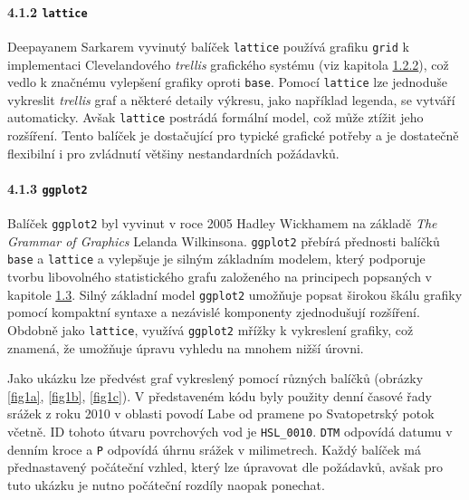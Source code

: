 \documentclass[12pt,]{article}
\let\oldparagraph\paragraph
\renewcommand{\paragraph}[1]{\oldparagraph{#1}\mbox{}}
\begin{document}
\paragraph{\texorpdfstring{4.1.2
\texttt{lattice}}{4.1.2 lattice}}\label{lattice}

\qquad Deepayanem Sarkarem vyvinutý balíček \texttt{lattice} používá
grafiku \texttt{grid} k implementaci Clevelandového \emph{trellis}
grafického systému (viz kapitola \protect\hyperlink{cleveland}{1.2.2}),
což vedlo k značnému vylepšení grafiky oproti \texttt{base}. Pomocí
\texttt{lattice} lze jednoduše vykreslit \emph{trellis} graf a některé
detaily výkresu, jako například legenda, se vytváří automaticky. Avšak
\texttt{lattice} postrádá formální model, což může ztížit jeho
rozšíření. Tento balíček je dostačující pro typické grafické potřeby a
je dostatečně flexibilní i pro zvládnutí většiny nestandardních
požádavků.

\newpage

\hypertarget{ggplot}{\paragraph{\texorpdfstring{4.1.3
\texttt{ggplot2}}{4.1.3 ggplot2}}\label{ggplot}}

\qquad Balíček \texttt{ggplot2} byl vyvinut v roce 2005 Hadley Wickhamem
na základě \emph{The Grammar of Graphics} Lelanda Wilkinsona.
\texttt{ggplot2} přebírá přednosti balíčků \texttt{base} a
\texttt{lattice} a vylepšuje je silným základním modelem, který
podporuje tvorbu libovolného statistického grafu založeného na
principech popsaných v kapitole \protect\hyperlink{gg}{1.3}. Silný
základní model \texttt{ggplot2} umožňuje popsat širokou škálu grafiky
pomocí kompaktní syntaxe a nezávislé komponenty zjednodušují rozšíření.
Obdobně jako \texttt{lattice}, využívá \texttt{ggplot2} mřížky k
vykreslení grafiky, což znamená, že umožňuje úpravu vyhledu na mnohem
nižší úrovni.

\qquad Jako ukázku lze předvést graf vykreslený pomocí různých balíčků
(obrázky \ref{fig1a}, \ref{fig1b}, \ref{fig1c}). V představeném kódu
byly použity denní časové řady srážek z roku 2010 v oblasti povodí Labe
od pramene po Svatopetrský potok včetně. ID tohoto útvaru povrchových
vod je \texttt{HSL\_0010}. \texttt{DTM} odpovídá datumu v denním kroce a
\texttt{P} odpovídá úhrnu srážek v milimetrech. Každý balíček má
přednastavený počáteční vzhled, který lze úpravovat dle požádavků, avšak
pro tuto ukázku je nutno počáteční rozdíly naopak ponechat.
\end{document}
